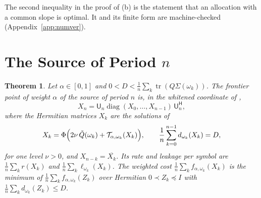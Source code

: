 \documentclass[11pt,onecolumn]{IEEEtran}
\newtheorem{theorem}{Theorem}
\newcommand{\tr}{\operatorname{tr}}
\newcommand{\tQ}{\tilde Q}
\newcommand{\herm}{\mathsf H}
\begin{document}
The second inequality in the proof of (b) is the statement that an
allocation with a common slope is optimal. It and its finite form are
machine-checked (Appendix~\ref{app:numver}).

\section{The Source of Period $n$}
\label{sec:periodic}

\begin{theorem}\label{thm:periodic}
Let $\alpha\in[0,1]$ and
$0<D<\tfrac1n\sum_k\tr(Q\Sigma(\omega_k))$. The frontier point of weight
$\alpha$ of the source of period $n$ is, in the whitened coordinate of
\cite{part1},
\[
X_n=\mathsf U_n\operatorname{diag}(X_0,\dots,X_{n-1})\,\mathsf U_n^{\herm},
\]
where the Hermitian matrices $X_k$ are the solutions of
\begin{equation}
X_k=\Phi\Bigl(2\nu\,\tQ(\omega_k)+\mathcal T_{\alpha,\omega_k}(X_k)\Bigr),
\qquad
\frac1n\sum_{k=0}^{n-1}d_{\omega_k}(X_k)=D ,
\label{eq:periodic}
\end{equation}
for one level $\nu>0$, and $X_{n-k}=\overline{X_k}$. Its rate and
leakage per symbol are $\tfrac1n\sum_kr(X_k)$ and
$\tfrac1n\sum_k\ell_{\omega_k}(X_k)$. The weighted cost
$\tfrac1n\sum_kf_{\alpha,\omega_k}(X_k)$ is the minimum of
$\tfrac1n\sum_kf_{\alpha,\omega_k}(Z_k)$ over Hermitian
$0\prec Z_k\preceq I$ with $\tfrac1n\sum_kd_{\omega_k}(Z_k)\le D$.
\end{theorem}
\end{document}
